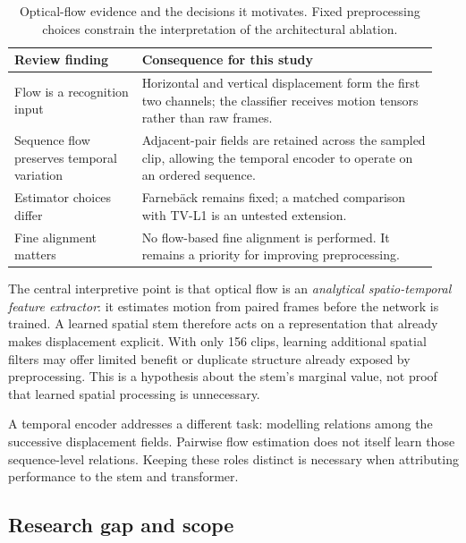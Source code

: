 \begin{table}[htbp]
    \centering
    \small
    \begin{tabular}{@{}p{0.29\linewidth} p{0.65\linewidth}@{}}
        \hline
        \textbf{Review finding} & \textbf{Consequence for this study} \\
        \hline
        Flow is a recognition input~\cite{liong2019a,see2019}
        & Horizontal and vertical displacement form the first two channels; the classifier receives motion tensors rather than raw frames. \\
        Sequence flow preserves temporal variation~\cite{zhaoS2021}
        & Adjacent-pair fields are retained across the sampled clip, allowing the temporal encoder to operate on an ordered sequence. \\
        Estimator choices differ~\cite{liong2019a,zhaoS2021,xu2017}
        & Farneb\"ack remains fixed; a matched comparison with TV-L1 is an untested extension. \\
        Fine alignment matters~\cite{xu2017}
        & No flow-based fine alignment is performed. It remains a priority for improving preprocessing. \\
        \hline
    \end{tabular}
    \caption[Optical-flow evidence and study decisions]{Optical-flow evidence and the decisions it motivates. Fixed preprocessing choices constrain the interpretation of the architectural ablation.}
    \label{tab:flow-decisions}
\end{table}

The central interpretive point is that optical flow is an \textit{analytical spatio-temporal feature extractor}: it estimates motion from paired frames before the network is trained. A learned spatial stem therefore acts on a representation that already makes displacement explicit. With only 156 clips, learning additional spatial filters may offer limited benefit or duplicate structure already exposed by preprocessing. This is a hypothesis about the stem's marginal value, not proof that learned spatial processing is unnecessary.

A temporal encoder addresses a different task: modelling relations among the successive displacement fields. Pairwise flow estimation does not itself learn those sequence-level relations. Keeping these roles distinct is necessary when attributing performance to the stem and transformer.

\subsection{Research gap and scope}
\label{sec:flow-gap}

